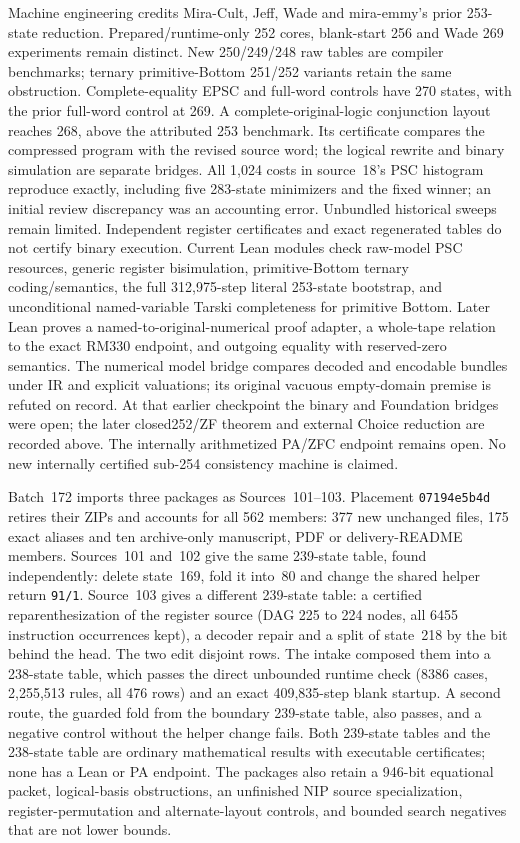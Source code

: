 \documentclass[11pt]{article}
\begin{document}
{Machine engineering credits Mira-Cult, Jeff, Wade and mira-emmy's prior
253-state reduction. Prepared/runtime-only 252 cores, blank-start 256 and
Wade 269 experiments remain distinct. New 250/249/248 raw tables are compiler
benchmarks; ternary primitive-Bottom 251/252 variants retain the same
obstruction. Complete-equality EPSC and full-word controls have 270 states,
with the prior full-word control at 269. A complete-original-logic conjunction
layout reaches 268, above the attributed 253 benchmark. Its certificate compares
the compressed program with the revised source word; the logical rewrite and
binary simulation are separate bridges. All 1,024 costs in source~18's PSC
histogram reproduce exactly, including five 283-state minimizers and the fixed
winner; an initial review discrepancy was an accounting error. Unbundled
historical sweeps remain limited.
Independent
register certificates and exact regenerated tables do not certify binary
execution. Current Lean modules check raw-model PSC resources, generic register
bisimulation, primitive-Bottom ternary coding/semantics, the full 312,975-step
literal 253-state bootstrap, and unconditional named-variable Tarski completeness
for primitive Bottom. Later Lean proves a named-to-original-numerical proof
adapter, a whole-tape relation to the exact RM330 endpoint, and outgoing equality
with reserved-zero semantics. The numerical model bridge compares decoded and encodable bundles under IR
and explicit valuations; its original vacuous empty-domain premise is refuted
on record. At that earlier checkpoint the binary and Foundation bridges were open;
the later closed252/ZF theorem and external Choice reduction are recorded above.
The internally arithmetized PA/ZFC endpoint remains open.
No new internally certified sub-254 consistency machine is claimed.

Batch~172 imports three packages as Sources~101--103. Placement
\texttt{07194e5b4d} retires their ZIPs and accounts for all 562 members: 377
new unchanged files, 175 exact aliases and ten archive-only manuscript, PDF or
delivery-README members. Sources~101 and~102 give the same 239-state table,
found independently: delete state~169, fold it into~80 and change the shared
helper return \texttt{91/1}. Source~103 gives a different 239-state table: a
certified reparenthesization of the register source (DAG 225 to 224 nodes, all
6455 instruction occurrences kept), a decoder repair and a split of state~218
by the bit behind the head. The two edit disjoint rows. The intake composed
them into a 238-state table, which passes the direct unbounded runtime check
(8386 cases, 2,255,513 rules, all 476 rows) and an exact 409,835-step blank
startup. A second route, the guarded fold from the boundary 239-state table,
also passes, and a negative control without the helper change fails. Both
239-state tables and the 238-state table are ordinary mathematical results with
executable certificates; none has a Lean or PA endpoint. The packages also
retain a 946-bit equational packet, logical-basis obstructions, an unfinished
NIP source specialization, register-permutation and alternate-layout controls,
and bounded search negatives that are not lower bounds.

}
\end{document}
